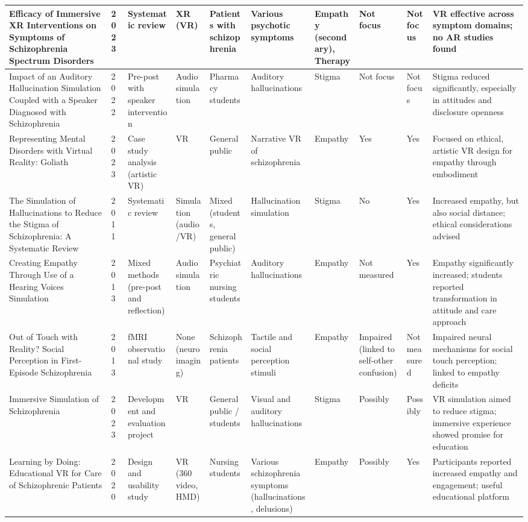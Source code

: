 \begin{landscape}
\begin{longtable}{|p{2.8cm}|p{0.6cm}|p{1.8cm}|p{1.2cm}|p{1.2cm}|p{2cm}|p{1.2cm}|p{1.2cm}|p{1.2cm}|p{3cm}|}
    \hline
    Efficacy of Immersive XR Interventions on Symptoms of Schizophrenia Spectrum Disorders & 2023 & Systematic review & XR (VR) & Patients with schizophrenia & Various psychotic symptoms & Empathy (secondary), Therapy & Not focus & Not focus & VR effective across symptom domains; no AR studies found \\
    \hline
    Impact of an Auditory Hallucination Simulation Coupled with a Speaker Diagnosed with Schizophrenia & 2022 & Pre-post with speaker intervention & Audio simulation & Pharmacy students & Auditory hallucinations & Stigma & Not focus & Not focus & Stigma reduced significantly, especially in attitudes and disclosure openness \\
    \hline
    Representing Mental Disorders with Virtual Reality: Goliath & 2023 & Case study analysis (artistic VR) & VR & General public & Narrative VR of schizophrenia & Empathy & Yes & Yes & Focused on ethical, artistic VR design for empathy through embodiment \\
    \hline
    The Simulation of Hallucinations to Reduce the Stigma of Schizophrenia: A Systematic Review & 2011 & Systematic review & Simulation (audio/VR) & Mixed (students, general public) & Hallucination simulation & Stigma & No & Yes & Increased empathy, but also social distance; ethical considerations advised \\
    \hline
    Creating Empathy Through Use of a Hearing Voices Simulation & 2013 & Mixed methods (pre-post and reflection) & Audio simulation & Psychiatric nursing students & Auditory hallucinations & Empathy & Not measured & Yes & Empathy significantly increased; students reported transformation in attitude and care approach \\
    \hline
    Out of Touch with Reality? Social Perception in First-Episode Schizophrenia & 2013 & fMRI observational study & None (neuroimaging) & Schizophrenia patients & Tactile and social perception stimuli & Empathy & Impaired (linked to self-other confusion) & Not measured & Impaired neural mechanisms for social touch perception; linked to empathy deficits \\
    \hline
    Immersive Simulation of Schizophrenia & 2023 & Development and evaluation project & VR & General public / students & Visual and auditory hallucinations & Stigma & Possibly & Possibly & VR simulation aimed to reduce stigma; immersive experience showed promise for education \\
    \hline
    Learning by Doing: Educational VR for Care of Schizophrenic Patients & 2020 & Design and usability study & VR (360 video, HMD) & Nursing students & Various schizophrenia symptoms (hallucinations, delusions) & Empathy & Possibly & Yes & Participants reported increased empathy and engagement; useful educational platform \\

\end{longtable}
\end{landscape}

